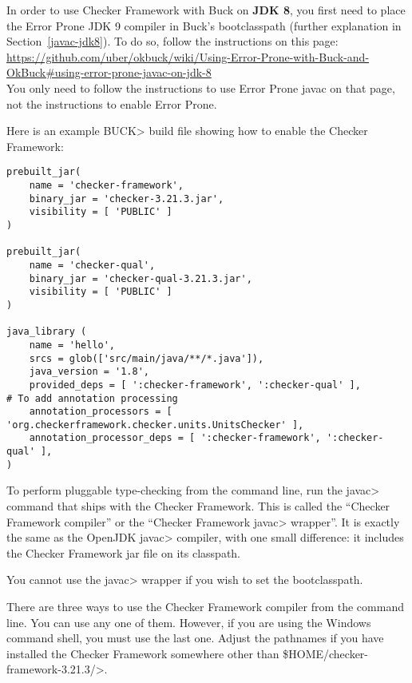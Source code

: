 In order to use Checker Framework with Buck on \textbf{JDK 8}, you first need
to place the Error Prone JDK 9 compiler in Buck's bootclasspath
(further explanation in Section~\ref{javac-jdk8}).  To do so,
follow the instructions on this page: \\
{\codesize\url{https://github.com/uber/okbuck/wiki/Using-Error-Prone-with-Buck-and-OkBuck#using-error-prone-javac-on-jdk-8}} \\
You only need to follow the instructions to use Error Prone javac on
that page, not the instructions to enable Error Prone.

Here is an example \<BUCK> build
file showing how to enable the Checker Framework:

\begin{Verbatim}
prebuilt_jar(
    name = 'checker-framework',
    binary_jar = 'checker-3.21.3.jar',
    visibility = [ 'PUBLIC' ]
)

prebuilt_jar(
    name = 'checker-qual',
    binary_jar = 'checker-qual-3.21.3.jar',
    visibility = [ 'PUBLIC' ]
)

java_library (
    name = 'hello',
    srcs = glob(['src/main/java/**/*.java']),
    java_version = '1.8',
    provided_deps = [ ':checker-framework', ':checker-qual' ],
# To add annotation processing
    annotation_processors = [ 'org.checkerframework.checker.units.UnitsChecker' ],
    annotation_processor_deps = [ ':checker-framework', ':checker-qual' ],
)
\end{Verbatim}



\label{javac-installation}      %

To perform pluggable type-checking from the command line, run the \<javac>
command that ships with the Checker Framework.  This is called the
``Checker Framework compiler'' or the ``Checker Framework \<javac> wrapper''.
It is exactly the same as the OpenJDK
\<javac> compiler, with one small difference:  it includes the Checker
Framework jar file on its classpath.

You cannot use the \<javac> wrapper if you wish to set the bootclasspath.

There are three ways to use the Checker Framework compiler from the command
line.  You can use any
one of them.  However, if you are using the Windows command shell, you must
use the last one.
Adjust the pathnames if you have installed the Checker Framework somewhere
other than \<\${HOME}/checker-framework-3.21.3/>.



